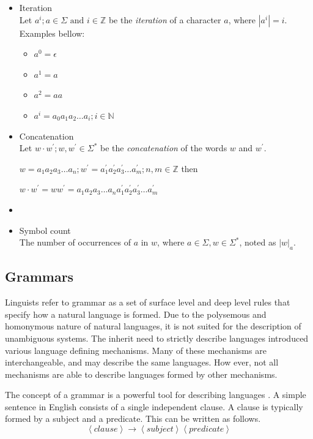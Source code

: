 \begin{itemize}
\item Iteration\\
  Let $a^i; a \in \Sigma \text{ and } i \in \mathbb{Z}$ be the \emph{iteration} of a character $a$, where $|a^i| = i$.\\
Examples bellow:


\begin{itemize}
\item $a^0 = \epsilon$
\item $a^1 = a$
\item $a^2 = aa$
\item $a^i = a_0 a_1 a_2 \dots a_i; i \in \mathbb{N}$
\end{itemize}


\item Concatenation\\
  Let $w \cdot w^{'}; w, w^{'} \in \Sigma^{*}$ be the \emph{concatenation} of the words $w$ and $w^{'}$.

$w = a_1 a_2 a_3 \dots a_n ; w^{'} = a^{'}_1 a^{'}_2 a^{'}_3 \dots a^{'}_m; n,m \in \mathbb{Z}$ then  

$w\cdot w^{'} = w w^{'} = a_1 a_2 a_3 \dots a_n a^{'}_1 a^{'}_2 a^{'}_3 \dots a^{'}_m$


\item {}
\item Symbol count\\
The number of occurrences of $a$ in $w$, where $a \in \Sigma, w \in \Sigma^{*}$, noted as $|w|_{a}$.

\end{itemize}

\subsection{Grammars}
Linguists refer to grammar as a set of surface level and deep level rules that specify how a natural language is formed. Due to the polysemous and homonymous nature of natural languages, it is not suited for the description of unambiguous systems. The inherit need to strictly describe languages introduced various language defining mechanisms. Many of these mechanisms are interchangeable, and may describe the same languages. How ever, not all mechanisms are able to describe languages formed by other mechanisms.

The concept of a grammar is a powerful tool for describing languages \cite[p. 52]{Linz2016Introduction}. A simple sentence in English consists of a single independent clause. A clause is typically formed by a subject and a predicate. This can be written as follows.
$$ \left< clause \right> \rightarrow \left< subject \right> \left< predicate \right> $$

